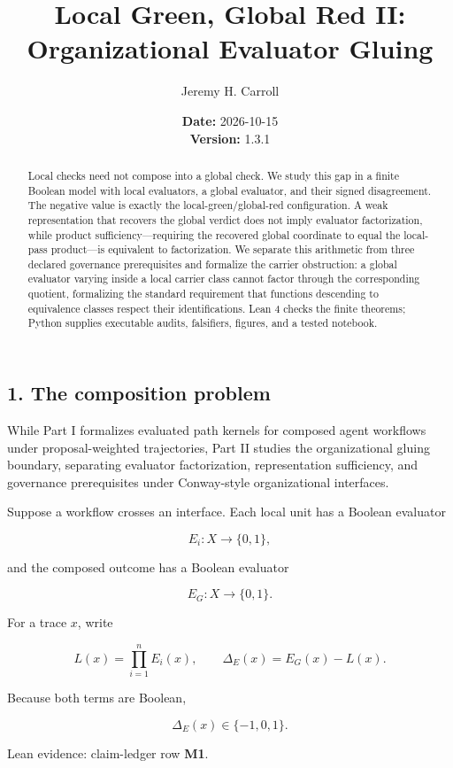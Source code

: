 \documentclass[
  11pt,
]{article}
\title{Local Green, Global Red II: Organizational Evaluator Gluing}
\author{Jeremy H. Carroll}
\date{\textbf{Date:} 2026-10-15\\
\textbf{Version:} 1.3.1\\}
\theoremstyle{plain}
\theoremstyle{definition}\newtheorem{definition}[theorem]{Definition}
\theoremstyle{remark}\newtheorem*{remark}{Remark}
\begin{document}
\maketitle
\begin{abstract}
Local checks need not compose into a global check. We study this gap in
a finite Boolean model with local evaluators, a global evaluator, and
their signed disagreement. The negative value is exactly the
local-green/global-red configuration. A weak representation that
recovers the global verdict does not imply evaluator factorization,
while product sufficiency---requiring the recovered global coordinate to
equal the local-pass product---is equivalent to factorization. We
separate this arithmetic from three declared governance prerequisites
and formalize the carrier obstruction: a global evaluator varying inside
a local carrier class cannot factor through the corresponding quotient,
formalizing the standard requirement that functions descending to
equivalence classes respect their identifications. Lean 4 checks the
finite theorems; Python supplies executable audits, falsifiers, figures,
and a tested notebook.
\end{abstract}

\subsection{1. The composition problem}\label{the-composition-problem}

While Part I formalizes evaluated path kernels for composed agent
workflows under proposal-weighted trajectories, Part II studies the
organizational gluing boundary, separating evaluator factorization,
representation sufficiency, and governance prerequisites under
Conway-style organizational interfaces.

Suppose a workflow crosses an interface. Each local unit has a Boolean
evaluator

\[
E_i:X\to\{0,1\},
\]

and the composed outcome has a Boolean evaluator

\[
E_G:X\to\{0,1\}.
\]

For a trace \(x\), write

\[
L(x)=\prod_{i=1}^{n}E_i(x), \qquad
\Delta_E(x)=E_G(x)-L(x).
\]

Because both terms are Boolean,

\[
\Delta_E(x)\in\{-1,0,1\}.
\]

Lean evidence: claim-ledger row \textbf{M1}.
\end{document}
